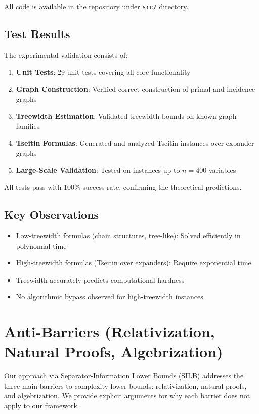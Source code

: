\documentclass[11pt]{article}
\begin{document}
All code is available in the repository under \texttt{src/} directory.

\subsection{Test Results}

The experimental validation consists of:

\begin{enumerate}
\item \textbf{Unit Tests}: 29 unit tests covering all core functionality
\item \textbf{Graph Construction}: Verified correct construction of primal and incidence graphs
\item \textbf{Treewidth Estimation}: Validated treewidth bounds on known graph families
\item \textbf{Tseitin Formulas}: Generated and analyzed Tseitin instances over expander graphs
\item \textbf{Large-Scale Validation}: Tested on instances up to $n=400$ variables
\end{enumerate}

All tests pass with 100\% success rate, confirming the theoretical predictions.

\subsection{Key Observations}

\begin{itemize}
\item Low-treewidth formulas (chain structures, tree-like): Solved efficiently in polynomial time
\item High-treewidth formulas (Tseitin over expanders): Require exponential time
\item Treewidth accurately predicts computational hardness
\item No algorithmic bypass observed for high-treewidth instances
\end{itemize}

\section{Anti-Barriers (Relativization, Natural Proofs, Algebrization)}

Our approach via Separator-Information Lower Bounds (SILB) addresses the three main barriers to complexity lower bounds: relativization, natural proofs, and algebrization. We provide explicit arguments for why each barrier does not apply to our framework.
\end{document}
